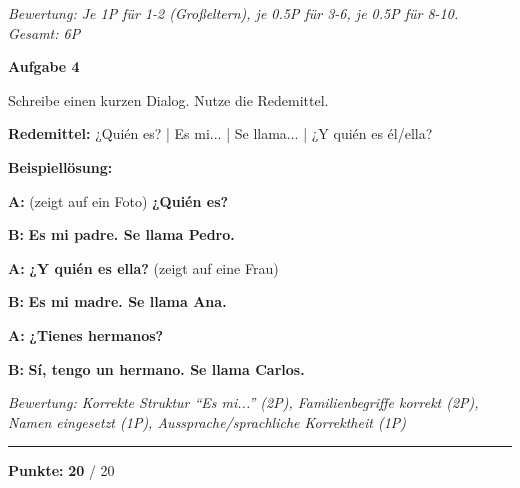 \documentclass[11pt, a4paper]{article}
\newcommand{\fachfarbe}{spanisch}
\newcommand{\maxpunkte}{20}
\newcommand{\punktebox}[1]{\hfill\fbox{\small \_/#1}}
\newcommand{\loesung}[1]{\textcolor{loesung}{\textbf{#1}}}
\newcommand{\es}[1]{\textcolor{\fachfarbe}{\textbf{#1}}}
\newenvironment{aufgabe}[1]{%
    \needspace{5\baselineskip}%
    \nopagebreak[4]%
    \vspace{10pt}
    \noindent\textbf{\textcolor{\fachfarbe}{Aufgabe #1}}
    \nopagebreak[4]%
    \vspace{5pt}
    \nopagebreak[4]%
    \begin{list}{}{\leftmargin=0pt}
    \item[]
}{%
    \end{list}
}
\begin{document}
\textit{\textcolor{grau}{Bewertung: Je 1P für 1-2 (Großeltern), je 0.5P für 3-6, je 0.5P für 8-10. Gesamt: 6P}}

\vspace{15pt}


\begin{aufgabe}{4}
Schreibe einen kurzen Dialog. Nutze die Redemittel. \punktebox{6}
\end{aufgabe}

\begin{hinweis}
\textbf{Redemittel:} ¿Quién es? | Es mi... | Se llama... | ¿Y quién es él/ella?
\end{hinweis}

\vspace{0.5em}

\textbf{Beispiellösung:}

\noindent
\textbf{A:} (zeigt auf ein Foto) \es{¿Quién es?}

\vspace{0.3em}
\textbf{B:} \loesung{Es mi padre. Se llama Pedro.}

\vspace{0.3em}
\textbf{A:} \es{¿Y quién es ella?} (zeigt auf eine Frau)

\vspace{0.3em}
\textbf{B:} \loesung{Es mi madre. Se llama Ana.}

\vspace{0.3em}
\textbf{A:} \loesung{¿Tienes hermanos?}

\vspace{0.3em}
\textbf{B:} \loesung{Sí, tengo un hermano. Se llama Carlos.}

\vspace{1em}
\textit{\textcolor{grau}{Bewertung: Korrekte Struktur ``Es mi...'' (2P), Familienbegriffe korrekt (2P), Namen eingesetzt (1P), Aussprache/sprachliche Korrektheit (1P)}}

\vspace{20pt}
\hrule
\vspace{10pt}

\begin{flushright}
\textbf{Punkte:} \loesung{\maxpunkte} / \maxpunkte
\end{flushright}
\end{document}
